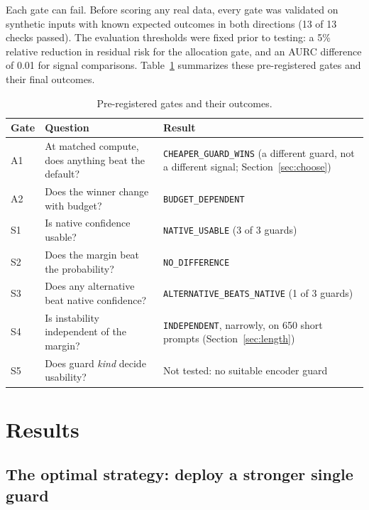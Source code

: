 \documentclass[11pt]{article}
\begin{document}
Each gate can fail. Before scoring any real data, every gate was validated on synthetic inputs with known expected outcomes in both directions (13 of 13 checks passed). The evaluation thresholds were fixed prior to testing: a 5\% relative reduction in residual risk for the allocation gate, and an AURC difference of 0.01 for signal comparisons. Table~\ref{tab:gates} summarizes these pre-registered gates and their final outcomes.

\begin{table}[ht]
\centering
\small
\caption{Pre-registered gates and their outcomes.}
\label{tab:gates}
\begin{tabular}{llp{6.2cm}}
\toprule
Gate & Question & Result \\
\midrule
A1 & At matched compute, does anything beat the default? & \texttt{CHEAPER\_GUARD\_WINS} (a different guard, not a different signal; Section~\ref{sec:choose}) \\
A2 & Does the winner change with budget? & \texttt{BUDGET\_DEPENDENT} \\
S1 & Is native confidence usable? & \texttt{NATIVE\_USABLE} (3 of 3 guards) \\
S2 & Does the margin beat the probability? & \texttt{NO\_DIFFERENCE} \\
S3 & Does any alternative beat native confidence? & \texttt{ALTERNATIVE\_BEATS\_NATIVE} (1 of 3 guards) \\
S4 & Is instability independent of the margin? & \texttt{INDEPENDENT}, narrowly, on 650 short prompts (Section~\ref{sec:length}) \\
S5 & Does guard \emph{kind} decide usability? & Not tested: no suitable encoder guard \\
\bottomrule
\end{tabular}
\end{table}

\section{Results}
\label{sec:results}

\subsection{The optimal strategy: deploy a stronger single guard}
\label{sec:answer}
\end{document}
